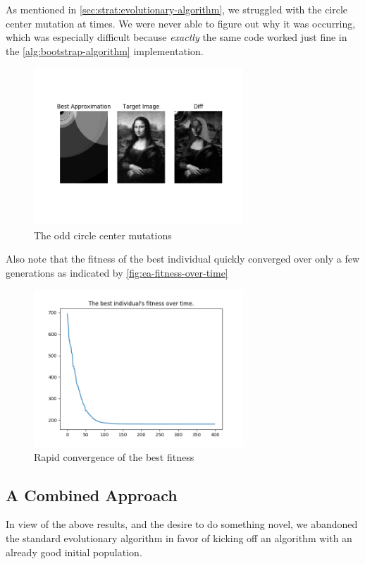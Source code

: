 \documentclass{article}
\begin{document}
As mentioned in \autoref{sec:strat:evolutionary-algorithm}, we struggled with the circle center mutation at times. We were never able to figure out why it was occurring, which was especially difficult because \textit{exactly} the same code worked just fine in the \autoref{alg:bootstrap-algorithm} implementation.

\begin{figure}[H]
    \centering
    \includegraphics[width=0.7\textwidth]{output/ea-p100c200g400.png}
    \caption{The odd circle center mutations}\label{fig:center-mutations}
\end{figure}

Also note that the fitness of the best individual quickly converged over only a few generations as indicated by \autoref{fig:ea-fitness-over-time}

\begin{figure}[H]
    \centering
    \includegraphics[width=0.7\textwidth]{output/ea-cooler-p100c200g400-fitness.png}
    \caption{Rapid convergence of the best fitness}\label{fig:ea-fitness-over-time}
\end{figure}

\subsection{A Combined Approach}\label{sec:results:combined-approach}
In view of the above results, and the desire to do something novel, we abandoned the standard evolutionary algorithm in favor of kicking off an algorithm with an already good initial population.
\end{document}
